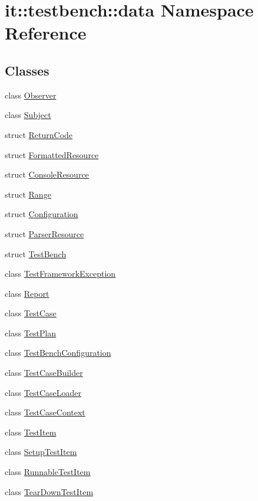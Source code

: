 \hypertarget{namespaceit_1_1testbench_1_1data}{\section{it\-:\-:testbench\-:\-:data Namespace Reference}
\label{dc/df9/namespaceit_1_1testbench_1_1data}
}
\subsection*{Classes}
\begin{DoxyCompactItemize}
\item 
class \hyperlink{classit_1_1testbench_1_1data_1_1Observer}{Observer}
\item 
class \hyperlink{classit_1_1testbench_1_1data_1_1Subject}{Subject}
\item 
struct \hyperlink{structit_1_1testbench_1_1data_1_1ReturnCode}{Return\-Code}
\item 
struct \hyperlink{structit_1_1testbench_1_1data_1_1FormattedResource}{Formatted\-Resource}
\item 
struct \hyperlink{structit_1_1testbench_1_1data_1_1ConsoleResource}{Console\-Resource}
\item 
struct \hyperlink{structit_1_1testbench_1_1data_1_1Range}{Range}
\item 
struct \hyperlink{structit_1_1testbench_1_1data_1_1Configuration}{Configuration}
\item 
struct \hyperlink{structit_1_1testbench_1_1data_1_1ParserResource}{Parser\-Resource}
\item 
struct \hyperlink{structit_1_1testbench_1_1data_1_1TestBench}{Test\-Bench}
\item 
class \hyperlink{classit_1_1testbench_1_1data_1_1TestFrameworkException}{Test\-Framework\-Exception}
\item 
class \hyperlink{classit_1_1testbench_1_1data_1_1Report}{Report}
\item 
class \hyperlink{classit_1_1testbench_1_1data_1_1TestCase}{Test\-Case}
\item 
class \hyperlink{classit_1_1testbench_1_1data_1_1TestPlan}{Test\-Plan}
\item 
class \hyperlink{classit_1_1testbench_1_1data_1_1TestBenchConfiguration}{Test\-Bench\-Configuration}
\item 
class \hyperlink{classit_1_1testbench_1_1data_1_1TestCaseBuilder}{Test\-Case\-Builder}
\item 
class \hyperlink{classit_1_1testbench_1_1data_1_1TestCaseLoader}{Test\-Case\-Loader}
\item 
class \hyperlink{classit_1_1testbench_1_1data_1_1TestCaseContext}{Test\-Case\-Context}
\item 
class \hyperlink{classit_1_1testbench_1_1data_1_1TestItem}{Test\-Item}
\item 
class \hyperlink{classit_1_1testbench_1_1data_1_1SetupTestItem}{Setup\-Test\-Item}
\item 
class \hyperlink{classit_1_1testbench_1_1data_1_1RunnableTestItem}{Runnable\-Test\-Item}
\item 
class \hyperlink{classit_1_1testbench_1_1data_1_1TearDownTestItem}{Tear\-Down\-Test\-Item}
\end{DoxyCompactItemize}
